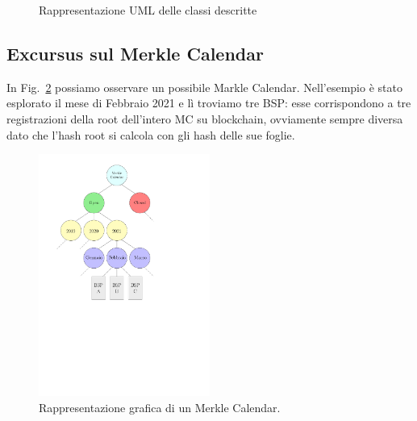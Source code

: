 \begin{figure}[H]
{
    }
    \caption{Rappresentazione UML delle classi descritte} \label{fi:umlMC}
\end{figure}

\newpage

\subsection{Excursus sul Merkle Calendar}

In Fig.~\ref{fi:mcIPE} possiamo osservare un possibile Markle Calendar.
Nell’esempio è stato esplorato il mese di Febbraio 2021 e lì troviamo tre BSP:
esse corrispondono a tre registrazioni della root dell’intero MC su blockchain, ovviamente
sempre diversa dato che l’hash root si calcola con gli hash delle sue foglie.

\begin{figure}[H]
    \centering
    \includegraphics[width=0.5\textwidth]{Figures/mc1}
    \caption{\small{
    Rappresentazione grafica di un Merkle Calendar.
    } %
    } %
    \label{fi:mcIPE}
\end{figure}


